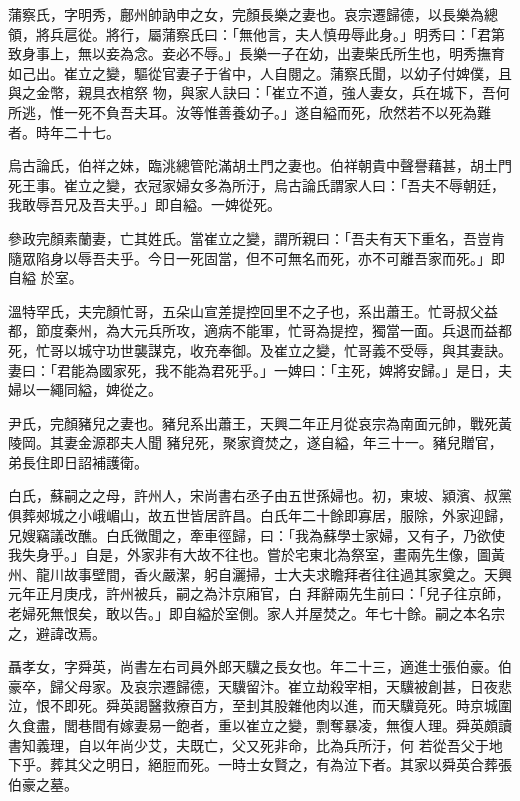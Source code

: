 \begin{pinyinscope}
 蒲察氏，字明秀，鄜州帥訥申之女，完顏長樂之妻也。哀宗遷歸德，以長樂為總領，將兵扈從。將行，屬蒲察氏曰：「無他言，夫人慎毋辱此身。」明秀曰：「君第致身事上，無以妾為念。妾必不辱。」長樂一子在幼，出妻柴氏所生也，明秀撫育如己出。崔立之變，驅從官妻子于省中，人自閱之。蒲察氏聞，以幼子付婢僕，且與之金幣，親具衣棺祭
 物，與家人訣曰：「崔立不道，強人妻女，兵在城下，吾何所逃，惟一死不負吾夫耳。汝等惟善養幼子。」遂自縊而死，欣然若不以死為難者。時年二十七。



 烏古論氏，伯祥之妹，臨洮總管陀滿胡土門之妻也。伯祥朝貴中聲譽藉甚，胡土門死王事。崔立之變，衣冠家婦女多為所汙，烏古論氏謂家人曰：「吾夫不辱朝廷，我敢辱吾兄及吾夫乎。」即自縊。一婢從死。



 參政完顏素蘭妻，亡其姓氏。當崔立之變，謂所親曰：「吾夫有天下重名，吾豈肯隨眾陷身以辱吾夫乎。今日一死固當，但不可無名而死，亦不可離吾家而死。」即自縊
 於室。



 溫特罕氏，夫完顏忙哥，五朵山宣差提控回里不之子也，系出蕭王。忙哥叔父益都，節度秦州，為大元兵所攻，適病不能軍，忙哥為提控，獨當一面。兵退而益都死，忙哥以城守功世襲謀克，收充奉御。及崔立之變，忙哥義不受辱，與其妻訣。妻曰：「君能為國家死，我不能為君死乎。」一婢曰：「主死，婢將安歸。」是日，夫婦以一繩同縊，婢從之。



 尹氏，完顏豬兒之妻也。豬兒系出蕭王，天興二年正月從哀宗為南面元帥，戰死黃陵岡。其妻金源郡夫人聞
 豬兒死，聚家資焚之，遂自縊，年三十一。豬兒贈官，弟長住即日詔補護衛。



 白氏，蘇嗣之之母，許州人，宋尚書右丞子由五世孫婦也。初，東坡、潁濱、叔黨俱葬郟城之小峨嵋山，故五世皆居許昌。白氏年二十餘即寡居，服除，外家迎歸，兄嫂竊議改醮。白氏微聞之，牽車徑歸，曰：「我為蘇學士家婦，又有子，乃欲使我失身乎。」自是，外家非有大故不往也。嘗於宅東北為祭室，畫兩先生像，圖黃州、龍川故事壁間，香火嚴潔，躬自灑掃，士大夫求瞻拜者往往過其家奠之。天興元年正月庚戌，許州被兵，嗣之為汴京廂官，白
 拜辭兩先生前曰：「兒子往京師，老婦死無恨矣，敢以告。」即自縊於室側。家人并屋焚之。年七十餘。嗣之本名宗之，避諱改焉。



 聶孝女，字舜英，尚書左右司員外郎天驥之長女也。年二十三，適進士張伯豪。伯豪卒，歸父母家。及哀宗遷歸德，天驥留汴。崔立劫殺宰相，天驥被創甚，日夜悲泣，恨不即死。舜英謁醫救療百方，至刲其股雜他肉以進，而天驥竟死。時京城圍久食盡，閭巷間有嫁妻易一飽者，重以崔立之變，剽奪暴凌，無復人理。舜英頗讀書知義理，自以年尚少艾，夫既亡，父又死非命，比為兵所汙，何
 若從吾父于地下乎。葬其父之明日，絕脰而死。一時士女賢之，有為泣下者。其家以舜英合葬張伯豪之墓。




\end{pinyinscope}
